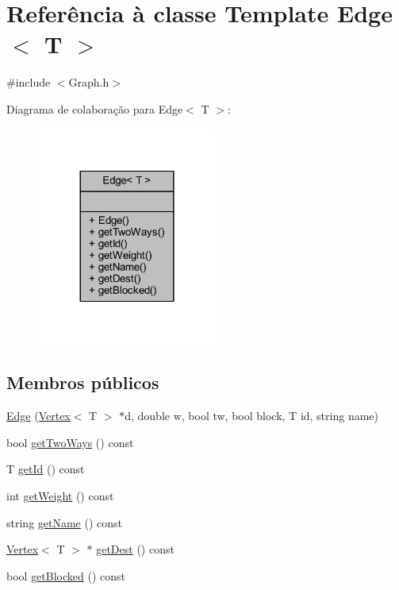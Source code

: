 \hypertarget{class_edge}{}\section{Referência à classe Template Edge$<$ T $>$}
\label{class_edge}


{\ttfamily \#include $<$Graph.\+h$>$}



Diagrama de colaboração para Edge$<$ T $>$\+:
\nopagebreak
\begin{figure}[H]
\begin{center}
\leavevmode
\includegraphics[width=168pt]{class_edge__coll__graph}
\end{center}
\end{figure}
\subsection*{Membros públicos}
\begin{DoxyCompactItemize}
\item 
\hyperlink{class_edge_aa83400a85aa2e50327bdc8ba854ad375}{Edge} (\hyperlink{class_vertex}{Vertex}$<$ T $>$ $\ast$d, double w, bool tw, bool block, T id, string name)
\item 
bool \hyperlink{class_edge_a330979d3f8be8f4f26889e046adf5eb2}{get\+Two\+Ways} () const 
\item 
T \hyperlink{class_edge_a655569c8bc3e9154d82a49ffebf0a8e6}{get\+Id} () const 
\item 
int \hyperlink{class_edge_a9c0f42ab235c2c427d2239bf5419b854}{get\+Weight} () const 
\item 
string \hyperlink{class_edge_a29153ede6a73b12918e3c05a9532cf4e}{get\+Name} () const 
\item 
\hyperlink{class_vertex}{Vertex}$<$ T $>$ $\ast$ \hyperlink{class_edge_a3805fa2e04f1e7f0495fbba6524ea823}{get\+Dest} () const 
\item 
bool \hyperlink{class_edge_a6b46f098c5d22a74ee404f34dd89c0eb}{get\+Blocked} () const 
\end{DoxyCompactItemize}
